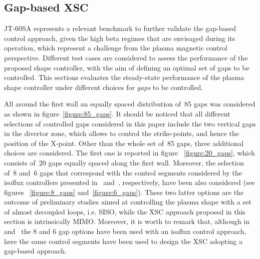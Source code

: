 \subsection{Gap-based XSC}

JT-60SA represents a relevant benchmark to further validate the gap-based control approach, given the high beta regimes that are envisaged during its operation, which represent a challenge from the plasma magnetic control perspective. Different test cases are considered to assess the performance of the proposed shape controller, with the aim of defining an optimal set of gaps to be controlled. This sections evaluates the steady-state performance of the plasma shape controller under different choices for \emph{gaps} to be controlled. \smallskip

 All around the first wall an equally spaced distribution of~85 gaps was considered as shown in figure~\ref{figure:85_gaps}. It should be noticed that all different selections of controlled gaps considered in this paper include the two vertical gaps in the divertor zone, which allows to control the strike-points, and hence the position of the X-point. Other than the whole set of~85 gaps,  three additional choices are considered. The first one is reported in figure ~\ref{figure:20_gaps}, which consists of~20 gaps equally spaced along the first wall. Moreover, the selection of~8 and~6 gaps that correspond with the control segments considered by the isoflux controllers presented in~\cite{miyata2013study} and~\cite{Miyata:2014}, respectively, have been also considered (see  figures ~\ref{figure:8_gaps} and~\ref{figure:6_gaps}). These two latter options are the outcome of preliminary studies aimed at controlling the plasma shape with a set of almost decoupled loops, i.e.  SISO, while the XSC approach proposed in this section is intrinsically MIMO. Moreover, it is worth to remark that, although in~\cite{miyata2013study} and~\cite{Miyata:2014} the 8 and 6 gap options have been used with an isoflux control approach, here the same control segments have been used to design the XSC adopting a gap-based approach.\smallskip


